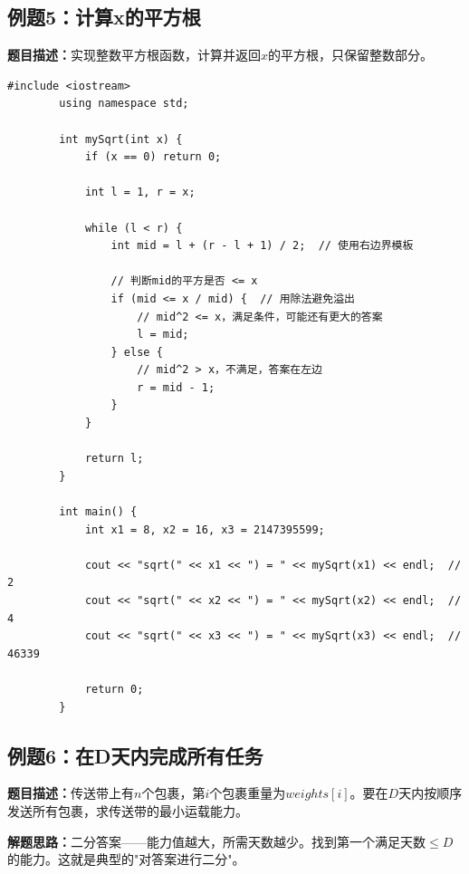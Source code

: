 \documentclass[12pt,a4paper]{article}
\begin{document}
	\subsection{例题5：计算x的平方根}
	
	\textbf{题目描述：}实现整数平方根函数，计算并返回$x$的平方根，只保留整数部分。
	
	\begin{lstlisting}[caption={例题5：x的平方根（整数版本）}]
		#include <iostream>
		using namespace std;
		
		int mySqrt(int x) {
			if (x == 0) return 0;
			
			int l = 1, r = x;
			
			while (l < r) {
				int mid = l + (r - l + 1) / 2;  // 使用右边界模板
				
				// 判断mid的平方是否 <= x
				if (mid <= x / mid) {  // 用除法避免溢出
					// mid^2 <= x，满足条件，可能还有更大的答案
					l = mid;
				} else {
					// mid^2 > x，不满足，答案在左边
					r = mid - 1;
				}
			}
			
			return l;
		}
		
		int main() {
			int x1 = 8, x2 = 16, x3 = 2147395599;
			
			cout << "sqrt(" << x1 << ") = " << mySqrt(x1) << endl;  // 2
			cout << "sqrt(" << x2 << ") = " << mySqrt(x2) << endl;  // 4
			cout << "sqrt(" << x3 << ") = " << mySqrt(x3) << endl;  // 46339
			
			return 0;
		}
	\end{lstlisting}
	
	\subsection{例题6：在D天内完成所有任务}
	
	\textbf{题目描述：}传送带上有$n$个包裹，第$i$个包裹重量为$weights[i]$。要在$D$天内按顺序发送所有包裹，求传送带的最小运载能力。
	
	\textbf{解题思路：}二分答案——能力值越大，所需天数越少。找到第一个满足天数$\leq D$的能力。这就是典型的"对答案进行二分"。
	
\end{document}
